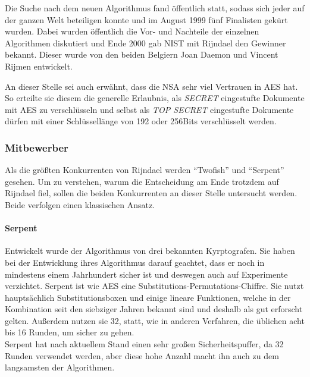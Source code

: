 Die Suche nach dem neuen Algorithmus fand öffentlich statt, sodass sich jeder auf der ganzen
Welt beteiligen konnte und im August 1999 fünf Finalisten gekürt wurden. Dabei wurden
öffentlich die Vor- und Nachteile der einzelnen Algorithmen diskutiert und Ende 2000 gab NIST
mit Rijndael den Gewinner bekannt. Dieser wurde von den beiden Belgiern Joan
Daemon und Vincent Rijmen entwickelt.

An dieser Stelle sei auch erwähnt, dass die \ac{NSA} sehr viel Vertrauen in AES hat. So erteilte
sie diesem die generelle Erlaubnis, als \emph{SECRET} eingestufte Dokumente mit AES zu
verschlüsseln und selbst als \emph{TOP SECRET} eingestufte Dokumente dürfen mit einer
Schlüssellänge von 192 oder 256Bits verschlüsselt werden. \cite{paar10}
 
 \subsubsection[Mitbewerber (Heumann)]{Mitbewerber}
 Als die größten Konkurrenten von Rijndael werden ``Twofish'' und ``Serpent'' gesehen. Um zu verstehen,
 warum die Entscheidung am Ende trotzdem auf Rijndael fiel, sollen die beiden Konkurrenten an dieser
 Stelle untersucht werden. Beide verfolgen einen klassischen Ansatz.
 
 \paragraph{Serpent}
 Entwickelt wurde der Algorithmus von drei bekannten Kyrptografen. Sie haben bei der Entwicklung ihres
 Algorithmus darauf geachtet, dass er noch in mindestens einem Jahrhundert sicher ist und deswegen auch
 auf Experimente verzichtet. Serpent ist wie AES eine Substitutions-Permutations-Chiffre. Sie nutzt
 hauptsächlich Substitutionsboxen und einige lineare Funktionen, welche
 in der Kombination seit den siebziger Jahren bekannt sind und deshalb als gut erforscht gelten.
 Außerdem nutzen sie 32, statt, wie in anderen Verfahren, die üblichen acht bis 16 Runden, um sicher zu gehen. \\
 Serpent hat nach aktuellem Stand einen sehr großen Sicherheitspuffer, da 32 Runden verwendet werden, aber
 diese hohe Anzahl macht ihn auch zu dem langsamsten der Algorithmen. \cite{schmeh07}
 
